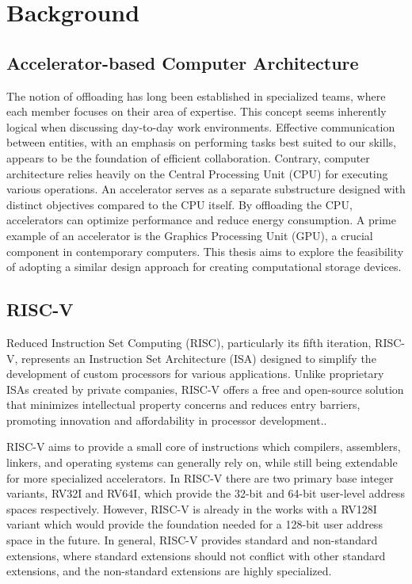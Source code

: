 \section{Background}
\subsection{Accelerator-based Computer Architecture}\label{sec:ACA}
The notion of offloading has long been established in specialized teams, where
each member focuses on their area of expertise. This concept seems inherently
logical when discussing day-to-day work environments. Effective communication
between entities, with an emphasis on performing tasks best suited to our
skills, appears to be the foundation of efficient collaboration.
Contrary, computer architecture relies heavily on the Central Processing Unit
(CPU) for executing various operations. An accelerator serves as a separate
substructure designed with distinct objectives compared to the CPU itself. By
offloading the CPU, accelerators can optimize performance and reduce energy
consumption\cite{AA}. A prime example of an accelerator is the Graphics
Processing Unit (GPU), a crucial component in contemporary computers.
This thesis aims to explore the feasibility of adopting a similar design
approach for creating computational storage devices.



\subsection{RISC-V}
Reduced Instruction Set Computing (RISC), particularly its fifth iteration,
RISC-V, represents an Instruction Set Architecture (ISA) designed to simplify
the development of custom processors for various applications. Unlike
proprietary ISAs created by private companies, RISC-V offers a free and
open-source solution that minimizes intellectual property concerns and reduces
entry barriers, promoting innovation and affordability in processor
development.\cite{ISAfree}.

RISC-V aims to provide a small core of instructions which compilers, assemblers,
linkers, and operating systems can generally rely on, while still being
extendable for more specialized accelerators. In RISC-V there are two primary
base integer variants, RV32I and RV64I, which provide the 32-bit and 64-bit
user-level address spaces respectively. However, RISC-V is already in the works
with a RV128I variant which would provide the foundation needed for a 128-bit
user address space in the future. In general, RISC-V provides standard and
non-standard extensions, where standard extensions should not conflict with
other standard extensions, and the non-standard extensions are highly
specialized.

